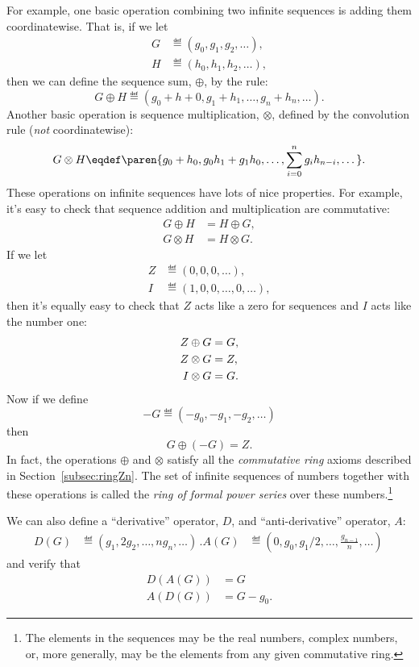 For example, one basic operation combining two infinite sequences is
adding them coordinatewise.  That is, if we let
\begin{align*}
G & \eqdef (g_0,g_1,g_2,\dots),\\
H & \eqdef (h_0,h_1,h_2,\dots),
\end{align*}
then we can define the sequence sum, $\oplus$, by the rule:
\[
G \oplus H \eqdef (g_0+h+0, g_1+h_1, \dots, g_n+h_n, \dots).
\]
Another basic operation is sequence multiplication, $\otimes$, defined
by the convolution rule (\emph{not} coordinatewise):
\[
G \otimes H \eqdef \paren{g_0+h_0, g_0h_1+g_1h_0, \dots, \sum_{i=0}^n g_ih_{n-i}, \dots}.
\]
These operations on infinite sequences have lots of nice properties.
For example, it's easy to check that sequence addition and
multiplication are commutative:
\begin{align*}
G \oplus H & = H \oplus G,\\
G \otimes H & = H \otimes G.
\end{align*}
If we let
\begin{align*}
Z & \eqdef (0,0,0,\dots),\\
I & \eqdef (1,0,0,\dots,0,\dots),
\end{align*}
then it's equally easy to check that $Z$ acts like a zero for
sequences and $I$ acts like the number one:
\begin{align}
Z \oplus G & = G,\notag\\
Z \otimes G & = Z,\label{ZoGZ}\\
I \otimes G & = G.\notag
\end{align}
Now if we define
\[
-G \eqdef (-g_0, -g_1, -g_2,\dots)
\]
then
\[
G \oplus (-G) = Z.
\]
In fact, the operations $\oplus$ and $\otimes$ satisfy all the
\emph{commutative ring} axioms described in
Section~\ref{subsec:ringZn}.  The set of infinite sequences of
numbers together with these operations is called the \emph{ring of
  formal power series}%
over these numbers.\footnote{The elements in
  the sequences may be the real numbers, complex numbers, or, more
  generally, may be the elements from any given commutative ring.}

\begin{editingnotes}
We can also define a ``derivative'' operator, $D$, and
``anti-derivative'' operator, $A$:
\begin{align*}
D(G) & \eqdef (g_1, 2g_2, \dots, ng_{n},\dots)\, .
A(G) & \eqdef (0, g_0, g_1/2, \dots, \frac{g_{n-1}}{n}, \dots)\,
\end{align*}
and verify that
\begin{align*}
D(A(G)) & = G\\
A(D(G)) & = G - g_0.
\end{align*}
\end{editingnotes}

